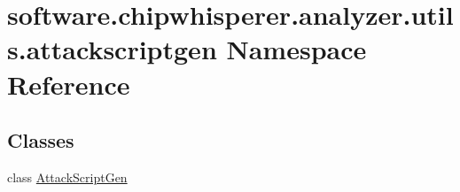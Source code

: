 \hypertarget{namespacesoftware_1_1chipwhisperer_1_1analyzer_1_1utils_1_1attackscriptgen}{}\section{software.\+chipwhisperer.\+analyzer.\+utils.\+attackscriptgen Namespace Reference}
\label{namespacesoftware_1_1chipwhisperer_1_1analyzer_1_1utils_1_1attackscriptgen}
\subsection*{Classes}
\begin{DoxyCompactItemize}
\item 
class \hyperlink{classsoftware_1_1chipwhisperer_1_1analyzer_1_1utils_1_1attackscriptgen_1_1AttackScriptGen}{Attack\+Script\+Gen}
\end{DoxyCompactItemize}
